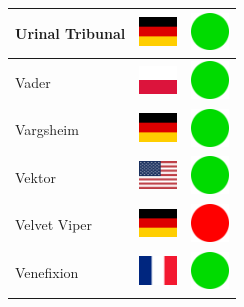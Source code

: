 \documentclass[12pt, a4paper, twoside]{report}
\begin{document}
\begin{center}
\begin{longtable}{|p{5cm}|p{2cm}|p{2cm}|}
 Urinal Tribunal                                            & \includegraphics[width=1cm]{4x3/de} &   \includegraphics[width=1cm]{likes/y} \\ \hline
 Vader                                                      & \includegraphics[width=1cm]{4x3/pl} &   \includegraphics[width=1cm]{likes/y} \\ \hline
 Vargsheim                                                  & \includegraphics[width=1cm]{4x3/de} &   \includegraphics[width=1cm]{likes/y} \\ \hline
 Vektor                                                     & \includegraphics[width=1cm]{4x3/us} &   \includegraphics[width=1cm]{likes/y} \\ \hline
 Velvet Viper                                               & \includegraphics[width=1cm]{4x3/de} &   \includegraphics[width=1cm]{likes/n} \\ \hline
 Venefixion                                                 & \includegraphics[width=1cm]{4x3/fr} &   \includegraphics[width=1cm]{likes/y} \\ \hline

\end{longtable}
\end{center}
\end{document}
